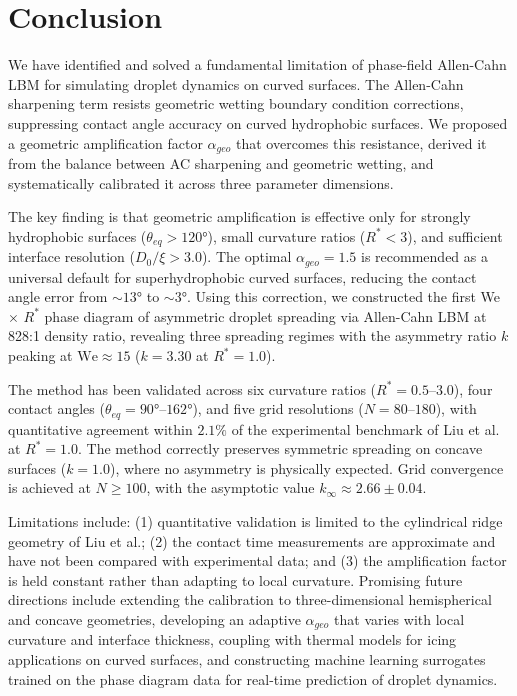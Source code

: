 \section{Conclusion}\label{sec:conclusion}

We have identified and solved a fundamental limitation of phase-field Allen-Cahn LBM for simulating droplet dynamics on curved surfaces. The Allen-Cahn sharpening term resists geometric wetting boundary condition corrections, suppressing contact angle accuracy on curved hydrophobic surfaces. We proposed a geometric amplification factor $\alpha_{geo}$ that overcomes this resistance, derived it from the balance between AC sharpening and geometric wetting, and systematically calibrated it across three parameter dimensions.

The key finding is that geometric amplification is effective only for strongly hydrophobic surfaces ($\theta_{eq} > 120°$), small curvature ratios ($R^* < 3$), and sufficient interface resolution ($D_0/\xi > 3.0$). The optimal $\alpha_{geo} = 1.5$ is recommended as a universal default for superhydrophobic curved surfaces, reducing the contact angle error from $\sim 13°$ to $\sim 3°$. Using this correction, we constructed the first We $\times$ $R^*$ phase diagram of asymmetric droplet spreading via Allen-Cahn LBM at 828:1 density ratio, revealing three spreading regimes with the asymmetry ratio $k$ peaking at $\mathrm{We} \approx 15$ ($k = 3.30$ at $R^*=1.0$).

The method has been validated across six curvature ratios ($R^* = 0.5$--$3.0$), four contact angles ($\theta_{eq} = 90°$--$162°$), and five grid resolutions ($N = 80$--$180$), with quantitative agreement within $2.1\%$ of the experimental benchmark of Liu et al.~\cite{liu2015symmetry} at $R^*=1.0$. The method correctly preserves symmetric spreading on concave surfaces ($k = 1.0$), where no asymmetry is physically expected. Grid convergence is achieved at $N \geq 100$, with the asymptotic value $k_\infty \approx 2.66 \pm 0.04$.

Limitations include: (1) quantitative validation is limited to the cylindrical ridge geometry of Liu et al.; (2) the contact time measurements are approximate and have not been compared with experimental data; and (3) the amplification factor is held constant rather than adapting to local curvature. Promising future directions include extending the calibration to three-dimensional hemispherical and concave geometries, developing an adaptive $\alpha_{geo}$ that varies with local curvature and interface thickness, coupling with thermal models for icing applications on curved surfaces, and constructing machine learning surrogates trained on the phase diagram data for real-time prediction of droplet dynamics.
